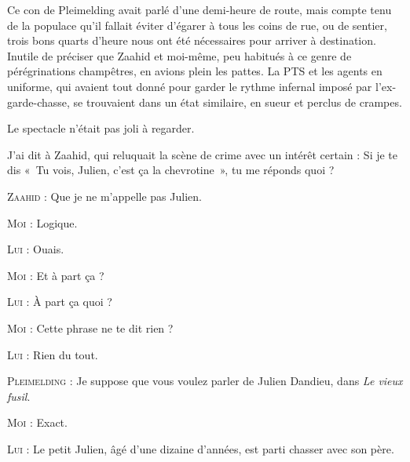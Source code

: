 Ce con de Pleimelding avait parlé d’une demi-heure de route, mais compte tenu de la populace qu’il fallait éviter d’égarer à tous les coins de rue, ou de sentier, trois bons quarts d’heure nous ont été nécessaires pour arriver à destination. Inutile de préciser que Zaahid et moi-même, peu habitués à ce genre de pérégrinations champêtres, en avions plein les pattes. La PTS et les agents en uniforme, qui avaient tout donné pour garder le rythme infernal imposé par l’ex-garde-chasse, se trouvaient dans un état similaire, en sueur et perclus de crampes.

Le spectacle n’était pas joli à regarder.

\begin{dialogue}
    
J’ai dit à Zaahid, qui reluquait la scène de crime avec un intérêt certain : Si je te dis «~Tu vois, Julien, c’est ça la chevrotine~», tu me réponds quoi ?

\textsc{Zaahid} : Que je ne m’appelle pas Julien.

%
%
%
\textsc{Moi} : Logique.

\textsc{Lui} : Ouais.

\textsc{Moi} : Et à part ça ?

\textsc{Lui} : À part ça quoi ?

\textsc{Moi} : Cette phrase ne te dit rien ?

\textsc{Lui} : Rien du tout.

\textsc{Pleimelding} : Je suppose que vous voulez parler de Julien Dandieu, dans \textit{Le vieux fusil}.

\textsc{Moi} : Exact.

\textsc{Lui} : Le petit Julien, âgé d’une dizaine d’années, est parti chasser avec son père.


\end{dialogue}
